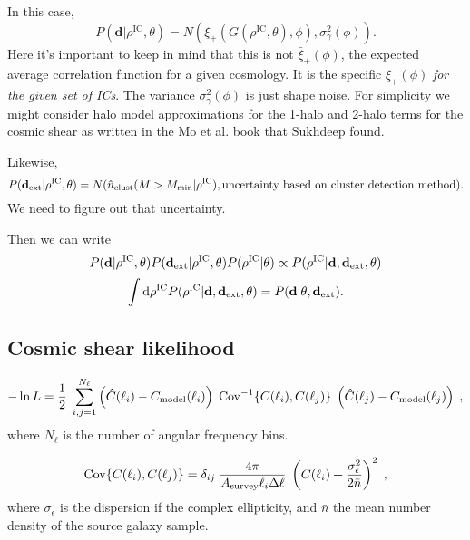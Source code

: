 \documentclass[preprint]{aastex}
\newcommand{\data}{\mathbf{d}}
\newcommand{\dataext}{\data_{\rm ext}}
\begin{document}
In this case,
\begin{equation}
	P(\data|\rho^\text{IC},\theta) = N(\xi_+(G(\rho^\text{IC},\theta), \phi), \sigma^2_\gamma(\phi)).
\end{equation}
Here it's important to keep in mind that this is not $\bar{\xi}_+(\phi)$, the expected average correlation
function for a given cosmology.  It is the specific $\xi_+(\phi)$ {\em for the given set of ICs}. The
variance $\sigma^2_\gamma(\phi)$ is just shape noise.  For simplicity we might consider halo model
approximations for the 1-halo and 2-halo terms for the cosmic shear as written in the Mo et al. book
that Sukhdeep found.  

Likewise,
\begin{equation}
	P(\dataext|\rho^\text{IC},\theta) = N(\hat{n}_\text{clust}(M>M_\text{min} |
	\rho^\text{IC}), \text{uncertainty based on cluster detection method}).
\end{equation}
We need to figure out that uncertainty.

Then we can write
\begin{equation}
	P(\data|\rho^\text{IC},\theta)P(\dataext|\rho^\text{IC},\theta)P(\rho^\text{IC}|\theta)
	\propto P(\rho^\text{IC}|\data,\dataext,\theta)
\end{equation}
\begin{equation}
	\int \mathrm{d}\rho^\text{IC} P(\rho^\text{IC}|\data,\dataext,\theta) = P(\data|\theta,
	\dataext).
\end{equation}


\subsection{Cosmic shear likelihood}

\begin{equation}
- \ln L = \frac{1}{2}\; \sum_{i,j=1}^{N_\ell} \left(  \hat{C}(\ell_i) - C_{\rm model}(\ell_i) \right)\; {\rm Cov}^{-1}\{  C(\ell_i), C(\ell_j) \}\; \left(  \hat{C}(\ell_j) - C_{\rm model}(\ell_j) \right)\;,
\end{equation}
where $N_\ell$ is the number of angular frequency bins.

\begin{equation}
{\rm Cov}\{  C(\ell_i), C(\ell_j) \}= \delta_{ij}\; \frac{4 \pi}{A_{\rm survey} \ell_i \Delta \ell}\; \left( C(\ell_i) + \frac{\sigma_\epsilon^2}{2 \bar{n}} \right)^2\;,
\end{equation}
where $\sigma_\epsilon$ is the dispersion if the complex ellipticity, and $\bar{n}$ the mean number density of the source galaxy sample.
\end{document}

